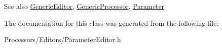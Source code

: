 \begin{DoxySeeAlso}{See also}
\hyperlink{classGenericEditor}{Generic\-Editor}, \hyperlink{classGenericProcessor}{Generic\-Processor}, \hyperlink{classParameter}{Parameter} 
\end{DoxySeeAlso}


The documentation for this class was generated from the following file\-:\begin{DoxyCompactItemize}
\item 
Processors/\-Editors/Parameter\-Editor.\-h\end{DoxyCompactItemize}
